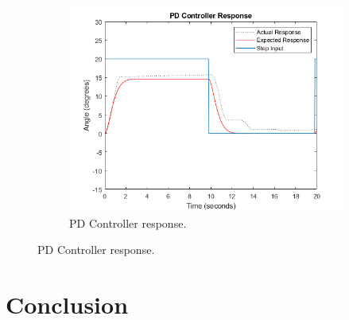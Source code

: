 \documentclass[12pt]{article} %
\begin{document}
\begin{figure}[H]
\begin{subfigure}[b]{0.4\textwidth}
		\includegraphics[width=\textwidth]{pd-control}
		\caption{PD Controller response.}
		\label{fig:pd-control}
	\end{subfigure}
\end{figure}


\blindtext

\blindtext

\blindtext

\newpage

\section{Conclusion}


\blindtext

\blindtext

\blindtext
\end{document}
